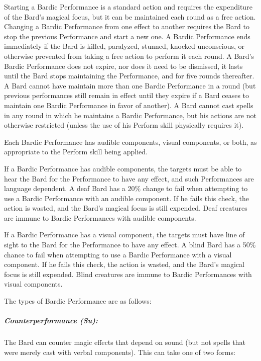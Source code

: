 
Starting a Bardic Performance is a standard action and requires the expenditure of the Bard's magical focus, but it can be maintained each round as a free action. 
Changing a Bardic Performance from one effect to another requires the Bard to stop the previous Performance and start a new one. 
A Bardic Performance ends immediately if the Bard is killed, paralyzed, stunned, knocked unconscious, or otherwise prevented from taking a free action to perform it each round. 
A Bard's Bardic Performance does not expire, nor does it need to be dismissed, it lasts until the Bard stops maintaining the Performance, and for five rounds thereafter. 
A Bard cannot have maintain more than one Bardic Performance in a round (but previous performances still remain in effect until they expire if a Bard ceases to maintain one Bardic Performance in favor of another). 
A Bard cannot cast spells in any round in which he maintains a Bardic Performance, but his actions are not otherwise restricted (unless the use of his Perform skill physically requires it).

Each Bardic Performance has audible components, visual components, or both, as appropriate to the Perform skill being applied.

If a Bardic Performance has audible components, the targets must be able to hear the Bard for the Performance to have any effect, and such Performances are language dependent. A deaf Bard has a 20\% change to fail when attempting to use a Bardic Performance with an audible component. If he fails this check, the action is wasted, and the Bard's magical focus is still expended. Deaf creatures are immune to Bardic Performances with audible components.

If a Bardic Performance has a visual component, the targets must have line of sight to the Bard for the Performance to have any effect. A blind Bard has a 50\% chance to fail when attempting to use a Bardic Performance with a visual component. If he fails this check, the action is wasted, and the Bard's magical focus is still expended. Blind creatures are immune to Bardic Performances with visual components.

The types of Bardic Performance are as follows:
\subparagraph{Counterperformance (Su):}
The Bard can counter magic effects that depend on sound (but not spells that were merely cast with verbal components). 
This can take one of two forms:
 
